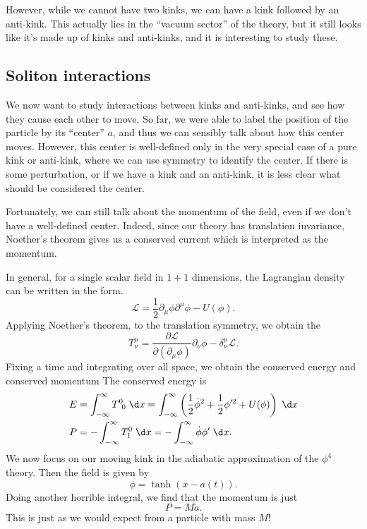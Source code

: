 \documentclass[a4paper]{article}
\begin{document}
However, while we cannot have two kinks, we can have a kink followed by an anti-kink. This actually lies in the ``vacuum sector'' of the theory, but it still looks like it's made up of kinks and anti-kinks, and it is interesting to study these.

\subsection{Soliton interactions}
We now want to study interactions between kinks and anti-kinks, and see how they cause each other to move. So far, we were able to label the position of the particle by its ``center'' $a$, and thus we can sensibly talk about how this center moves. However, this center is well-defined only in the very special case of a pure kink or anti-kink, where we can use symmetry to identify the center. If there is some perturbation, or if we have a kink and an anti-kink, it is less clear what should be considered the center.

Fortunately, we can still talk about the momentum of the field, even if we don't have a well-defined center. Indeed, since our theory has translation invariance, Noether's theorem gives us a conserved current which is interpreted as the momentum.

In general, for a single scalar field in $1 + 1$ dimensions, the Lagrangian density can be written in the form.
\[
  \mathcal{L} = \frac{1}{2} \partial_\mu \phi \partial^\mu \phi - U(\phi).
\]
Applying Noether's theorem, to the translation symmetry, we obtain the 
\[
  T^\mu_\nu = \frac{\partial \mathcal{L}}{\partial (\partial_\mu \phi)} \partial_\nu \phi - \delta^\mu_\nu \mathcal{L}.
\]
Fixing a time and integrating over all space, we obtain the conserved energy and conserved momentum
The conserved energy is
\begin{align*}
  E &= \int_{-\infty}^\infty T^0\!_0 \;\d x = \int_{-\infty}^\infty \left(\frac{1}{2}\dot{\phi}^2 + \frac{1}{2} \phi'^2 + U(\phi)\right)\;\d x\\
  P &= - \int_{-\infty}^\infty T^0_1 \;\d x = - \int_{-\infty}^\infty \dot{\phi} \phi' \;\d x.
\end{align*}
We now focus on our moving kink in the adiabatic approximation of the $\phi^4$ theory. Then the field is given by
\[
  \phi = \tanh (x - a(t)).
\]
Doing another horrible integral, we find that the momentum is just
\[
  P = M \dot{a}.
\]
This is just as we would expect from a particle with mass $M$!
\end{document}

